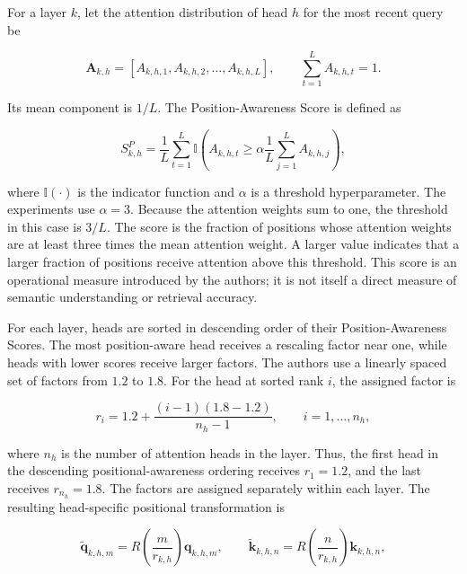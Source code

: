 For a layer \(k\), let the attention distribution of head \(h\) for the
most recent query be

\begin{equation}
    \mathbf{A}_{k,h}
    =
    [A_{k,h,1},A_{k,h,2},\ldots,A_{k,h,L}],
    \qquad
    \sum_{t=1}^{L}A_{k,h,t}=1.
    \label{eq:pe-mspoe-attention-vector}
\end{equation}

Its mean component is \(1/L\). The Position-Awareness Score is defined as

\begin{equation}
    S^P_{k,h}
    =
    \frac{1}{L}
    \sum_{t=1}^{L}
    \mathbb{I}
    \left(
        A_{k,h,t}
        \geq
        \alpha
        \frac{1}{L}
        \sum_{j=1}^{L}A_{k,h,j}
    \right),
    \label{eq:pe-position-awareness-score}
\end{equation}

where \(\mathbb{I}(\cdot)\) is the indicator function and \(\alpha\) is
a threshold hyperparameter. The experiments use \(\alpha=3\). Because
the attention weights sum to one, the threshold in this case is
\(3/L\). The score is the fraction of positions whose attention weights
are at least three times the mean attention weight. A larger value
indicates that a larger fraction of positions receive attention above
this threshold. This score is an operational measure introduced by the
authors; it is not itself a direct measure of semantic understanding or
retrieval accuracy.

For each layer, heads are sorted in descending order of their
Position-Awareness Scores. The most position-aware head receives a
rescaling factor near one, while heads with lower scores receive larger
factors. The authors use a linearly spaced set of factors from \(1.2\)
to \(1.8\). For the head at sorted rank \(i\), the assigned factor is

\begin{equation}
    r_i=
    1.2+
    \frac{(i-1)(1.8-1.2)}{n_h-1},
    \qquad i=1,\ldots,n_h,
    \label{eq:pe-mspoe-scaling-ratio}
\end{equation}

where \(n_h\) is the number of attention heads in the layer. Thus, the
first head in the descending positional-awareness ordering receives
\(r_1=1.2\), and the last receives \(r_{n_h}=1.8\). The factors are
assigned separately within each layer. The resulting head-specific
positional transformation is

\begin{equation}
    \widetilde{\mathbf{q}}_{k,h,m}
    =
    R\left(\frac{m}{r_{k,h}}\right)
    \mathbf{q}_{k,h,m},
    \qquad
    \widetilde{\mathbf{k}}_{k,h,n}
    =
    R\left(\frac{n}{r_{k,h}}\right)
    \mathbf{k}_{k,h,n},
    \label{eq:pe-mspoe-headwise-rope}
\end{equation}

